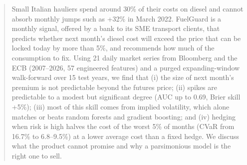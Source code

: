 \begin{abstract}
\noindent Small Italian hauliers spend around 30\% of their costs on diesel and cannot absorb monthly
jumps such as +32\% in March 2022. FuelGuard is a monthly signal, offered by a bank to its SME transport
clients, that predicts whether next month's diesel cost will exceed the price that can be locked today by more
than 5\%, and recommends how much of the consumption to fix. Using 21 daily market series from Bloomberg
and the ECB (2007--2026, 57 engineered features) and a purged expanding-window walk-forward over 15 test
years, we find that (i) the size of next month's premium is not predictable beyond the futures price; (ii)
spikes are predictable to a modest but significant degree (AUC up to 0.69, Brier skill +5\%); (iii) most of
this skill comes from implied volatility, which alone matches or beats random forests and gradient boosting;
and (iv) hedging when risk is high halves the cost of the worst 5\% of months (CVaR from 16.7\% to 6.8--9.5\%)
at a lower average cost than a fixed hedge. We discuss what the product cannot promise and why a parsimonious
model is the right one to sell.
\end{abstract}
